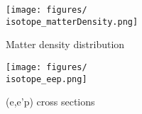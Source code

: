 {    \begin{figure}[H]
        \centering
            \texttt{[image: figures/\\isotope\_matterDensity.png]}
            \caption{Matter density distribution}
    \end{figure}

    \begin{figure}[H]
        \begin{center}
            \texttt{[image: figures/\\isotope\_eep.png]}
            \caption{(e,e'p) cross sections}
        \end{center}
    \end{figure}
}
